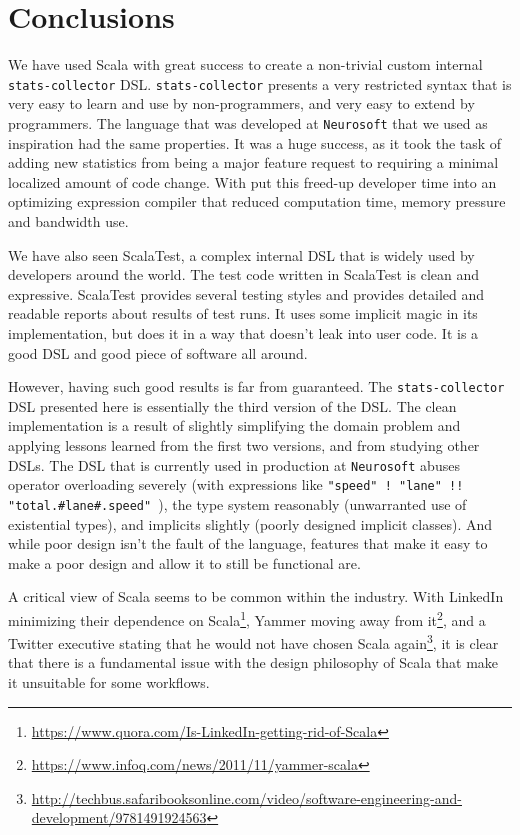 \chapter{Conclusions}

We have used Scala with great success to create a non-trivial custom internal \texttt{stats-collector} DSL. \texttt{stats-collector} presents a very restricted syntax that is very easy to learn and use by non-programmers, and very easy to extend by programmers. The language that was developed at \texttt{Neurosoft} that we used as inspiration had the same properties. It was a huge success, as it took the task of adding new statistics from being a major feature request to requiring a minimal localized amount of code change. With put this freed-up developer time into an optimizing expression compiler that reduced computation time, memory pressure and bandwidth use.

We have also seen ScalaTest, a complex internal DSL that is widely used by developers around the world. The test code written in ScalaTest is clean and expressive. ScalaTest provides several testing styles and provides detailed and readable reports about results of test runs. It uses some implicit magic in its implementation, but does it in a way that doesn't leak into user code. It is a good DSL and good piece of software all around.

However, having such good results is far from guaranteed. The \texttt{stats-collector} DSL presented here is essentially the third version of the DSL. The clean implementation is a result of slightly simplifying the domain problem and applying lessons learned from the first two versions, and from studying other DSLs. The DSL that is currently used in production at \texttt{Neurosoft} abuses operator overloading severely (with expressions like \texttt{"speed" ! "lane" !! "total.\#lane\#.speed" }), the type system reasonably (unwarranted use of existential types), and implicits slightly (poorly designed implicit classes). And while poor design isn't the fault of the language, features that make it easy to make a poor design and allow it to still be functional are.

A critical view of Scala seems to be common within the industry. With LinkedIn minimizing their dependence on Scala\footnote{\url{https://www.quora.com/Is-LinkedIn-getting-rid-of-Scala}}, Yammer moving away from it\footnote{\url{https://www.infoq.com/news/2011/11/yammer-scala}}, and a Twitter executive stating that he would not have chosen Scala again\footnote{\url{http://techbus.safaribooksonline.com/video/software-engineering-and-development/9781491924563}}, it is clear that there is a fundamental issue with the design philosophy of Scala that make it unsuitable for some workflows.


